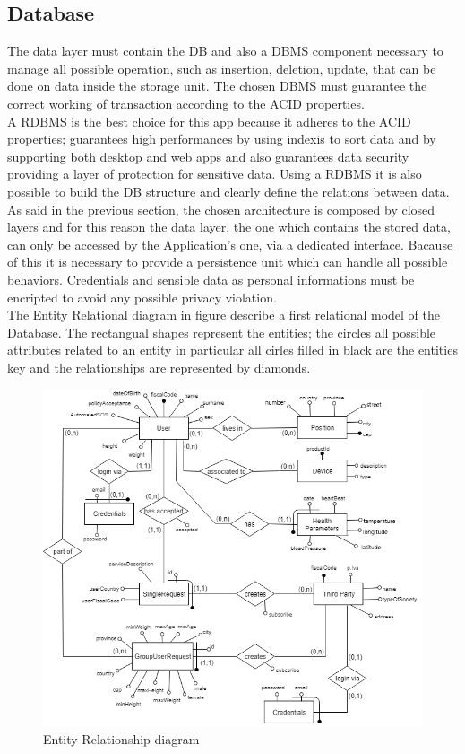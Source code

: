 \subsection{Database}
The data layer must contain the DB and also a DBMS component necessary to manage all possible operation, such as insertion, deletion, update, that can be done on data inside the storage unit. The chosen DBMS must guarantee the correct working of transaction according to the ACID properties.\\
A RDBMS is the best choice for this app because it adheres to the ACID properties; guarantees high performances by using indexis to sort data and by supporting both desktop and web apps and also guarantees data security providing a layer of protection for sensitive data. Using a RDBMS it is also possible to build  the DB structure and clearly define the relations between data.\\ 
As said in the previous section, the chosen architecture is composed by closed layers and for this reason  the data layer, the one which contains the stored data, can only be accessed by the Application's one, via a dedicated interface. Bacause of this it is necessary to provide a persistence unit which can handle all possible behaviors. Credentials and sensible data as personal informations must be encripted to avoid any possible privacy violation.\\
The Entity Relational diagram in figure describe a first relational model of the Database. The rectangual shapes represent the entities; the circles all possible attributes related to an entity in particular all cirles filled in black are the entities key and the relationships are represented by diamonds.

\begin{figure}[h!]
	\includegraphics[width=1.0\textwidth]{./pictures/ER_diagram.png}\par
	\caption{Entity Relationship diagram}
\end{figure}
\FloatBarrier
